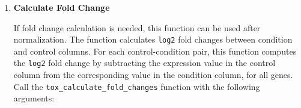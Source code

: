 \begin{enumerate}
\begin{enumerate}
                  \begin{itemize}
                    \item \texttt{df\_matrix}: A numeric matrix with genes as rows and tissues
                          as columns
                          
                    \item (Optional) \texttt{remove\_all\_zero\_genes}: Logical, whether
                          to remove genes that are all zeros (default = TRUE)
                          
                    \item (Optional) \texttt{na\_strategy}: Strategy for handling NA values:
                          "remove\_genes", "remove\_samples", "impute\_zero", "impute\_mean"
                          (default = "remove\_genes"
                          
                    \item (Optional) \texttt{min\_expression\_threshold}: Minimum expression
                          value to consider (values below this become 0 and default is 0)
                          
                    \item (Optional) \texttt{convert\_small\_to\_zero}: Logical, wheter
                          very small numbers should be converted to zero (default = FALSE)
                  \end{itemize}
                  
                  \textbf{Returns:}
                  \begin{itemize}
                    \item A cleaned matrix ready for normalization
                  \end{itemize}
                  
                  \begin{lstlisting}[language=R, caption={R Clean Data for Normalization}]
tox_clean_data_for_normalization(df_matrix, remove_all_zero_genes, 
    na_strategy, min_expression_threshold, convert_small_to_zero)
                  \end{lstlisting}
          \end{enumerate}
          
    \item \textbf{Calculate Fold Change}
          
          If fold change calculation is needed, this function can be used after
          normalization. The function calculates \texttt{log2} fold changes between
          condition and control columns. For each control-condition pair, this
          function computes the \texttt{log2} fold change by subtracting the expression
          value in the control column from the corresponding value in the condition column,
          for all genes. Call the \texttt{tox\_calculate\_fold\_changes} function
          with the following arguments:
          

\end{enumerate}
